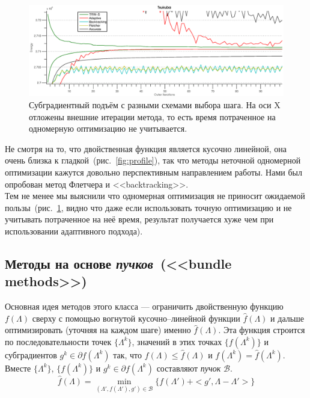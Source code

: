 \documentclass{article}
\begin{document}
\begin{figure}
    \centering
    \includegraphics[width=\textwidth]{subgradient_tsukuba}
    \caption{Субградиентный подъём с разными схемами выбора шага. На оси X отложены внешние итерации метода, то есть время потраченное на одномерную оптимизацию не учитывается.}
    \label{fig:1d_optimization}
\end{figure}
Не смотря на то, что двойственная функция является кусочно линейной, она очень близка к гладкой~(рис.~\ref{fig:profile}), так что методы неточной одномерной оптимизации кажутся довольно перспективным направлением работы. Нами был опробован метод Флетчера и <<backtracking>>.\\
Тем не менее мы выяснили что одномерная оптимизация не приносит ожидаемой пользы~(рис.~\ref{fig:1d_optimization}, видно что даже если использовать точную оптимизацию и не учитывать потраченное на неё время, результат получается хуже чем при использовании адаптивного подхода).


\subsection{Методы на основе \textit{пучков}~(<<bundle methods>>)}
Основная идея методов этого класса --- ограничить двойственную функцию $f(\Lambda)$ сверху с помощью вогнутой кусочно--линейной функции $\hat{f}(\Lambda)$ и дальше оптимизировать (уточняя на каждом шаге) именно $\hat{f}(\Lambda)$. Эта функция строится по последовательности точек $\{\Lambda^k\}$, значений в этих точках $\{f(\Lambda^k)\}$ и субградиентов $g^k \in \partial f(\Lambda^k)$ так, что $f(\Lambda) \leq \hat{f}(\Lambda)$ и $f(\Lambda^k) = \hat{f}(\Lambda^k)$. Вместе $\{\Lambda^k\}$, $\{f(\Lambda^k)\}$ и  $g^k \in \partial f(\Lambda^k)$ составляют \textit{пучок} $\mathcal{B}$.
\begin{equation}
\hat{f}(\Lambda) = \min_{(\Lambda{}', f(\Lambda{}'), g{}') \in \mathcal{B}} \{f(\Lambda{}') + <g{}', \Lambda - \Lambda{}'>\}
\end{equation}
\end{document}
